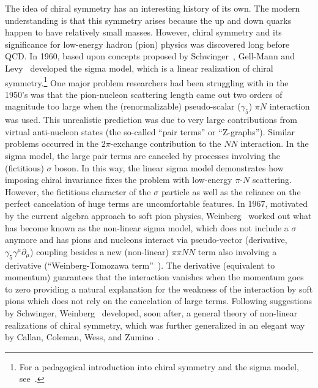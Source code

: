 \documentclass[sort&compress,preprint,3p]{elsarticle}
\begin{document}
The idea of chiral symmetry has an interesting history of its own.
The modern understanding is that this symmetry arises because the up and
down quarks happen to have relatively small masses.
However, chiral symmetry and its significance for low-energy hadron (pion)
physics was discovered long before QCD.
In 1960, based upon concepts proposed by Schwinger~\cite{Sch57},
Gell-Mann and Levy~\cite{GL60} developed the sigma model, which is
a linear realization of chiral symmetry.\footnote{For a pedagogical introduction into chiral symmetry
and the sigma model, see~\cite{EW88}.}
One major problem researchers had been struggling with in the 1950's was that the pion-nucleon
scattering length came out two orders of magnitude too
large when the (renormalizable) pseudo-scalar ($\gamma_5$) $\pi N$ interaction was used.
This unrealistic prediction was due to very large contributions from
virtual anti-nucleon states (the so-called ``pair terms'' or ``Z-graphs''). Similar problems
occurred in the $2\pi$-exchange contribution to the $NN$ interaction. 
In the sigma model, the large pair terms are canceled by processes
involving the (fictitious) $\sigma$ boson. In this way, the linear sigma model
demonstrates how imposing chiral invariance fixes the problem with low-energy
$\pi$-$N$ scattering. However, the fictitious character of the $\sigma$ particle as well as 
the reliance on the perfect
cancelation of huge terms are uncomfortable features.
In 1967, motivated by the current algebra approach to soft pion physics,
Weinberg~\cite{Wei67} worked out what has become known as the non-linear sigma model, which
does not include a $\sigma$ anymore and has pions and nucleons interact via pseudo-vector
(derivative, $\gamma_5 \gamma^\mu \partial_\mu$) 
coupling besides a new (non-linear) $\pi\pi NN$ term also involving a derivative
(``Weinberg-Tomozawa term''~\cite{Wei66,Tom66}).
The derivative (equivalent to momentum) guarantees that the interaction vanishes when the momentum goes to zero providing a natural explanation for the weakness of the interaction by
soft pions  which does not rely on the cancelation of large terms. 
Following suggestions by Schwinger, Weinberg~\cite{Wei68} developed, soon after, 
a general theory of non-linear realizations
of chiral symmetry, which was further generalized in an elegant way by
Callan, Coleman, Wess, and Zumino~\cite{CCWZ}.
\end{document}
